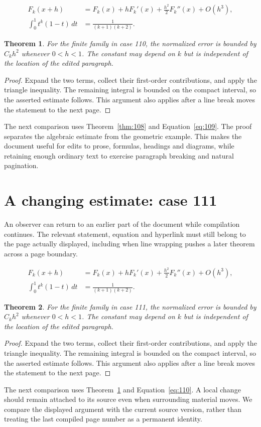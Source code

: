 \documentclass[a4paper,10pt]{article}
\newtheorem{theorem}{Theorem}[section]
\begin{document}
\lipsum[28-29]
\begin{align}\label{eq:109}
 F_k(x+h)&=F_k(x)+hF_k'(x)+\frac{h^2}{2}F_k''(x)+O(h^3),\\
 \int_0^1 t^k(1-t)\,dt&=\frac{1}{(k+1)(k+2)}.
\end{align}
\begin{theorem}\label{thm:109}
For the finite family in case 110, the normalized error is bounded by $C_k h^2$ whenever $0<h<1$. The constant may depend on $k$ but is independent of the location of the edited paragraph.
\end{theorem}
\begin{proof}
Expand the two terms, collect their first-order contributions, and apply the
triangle inequality. The remaining integral is bounded on the compact interval,
so the asserted estimate follows. This argument also applies after a line break
moves the statement to the next page.
\end{proof}
The next comparison uses Theorem~\ref{thm:108} and Equation~\ref{eq:109}. The proof separates the algebraic estimate from the geometric example. This makes the document useful for edits to prose, formulas, headings and diagrams, while retaining enough ordinary text to exercise paragraph breaking and natural pagination.

\lipsum[23]

\section{A changing estimate: case 111}\label{unit:110}
An observer can return to an earlier part of the document while compilation continues. The relevant statement, equation and hyperlink must still belong to the page actually displayed, including when line wrapping pushes a later theorem across a page boundary.

\lipsum[1-2]
\begin{align}\label{eq:110}
 F_k(x+h)&=F_k(x)+hF_k'(x)+\frac{h^2}{2}F_k''(x)+O(h^3),\\
 \int_0^1 t^k(1-t)\,dt&=\frac{1}{(k+1)(k+2)}.
\end{align}
\begin{theorem}\label{thm:110}
For the finite family in case 111, the normalized error is bounded by $C_k h^2$ whenever $0<h<1$. The constant may depend on $k$ but is independent of the location of the edited paragraph.
\end{theorem}
\begin{proof}
Expand the two terms, collect their first-order contributions, and apply the
triangle inequality. The remaining integral is bounded on the compact interval,
so the asserted estimate follows. This argument also applies after a line break
moves the statement to the next page.
\end{proof}
The next comparison uses Theorem~\ref{thm:109} and Equation~\ref{eq:110}. A local change should remain attached to its source even when surrounding material moves. We compare the displayed argument with the current source version, rather than treating the last compiled page number as a permanent identity.
\end{document}
